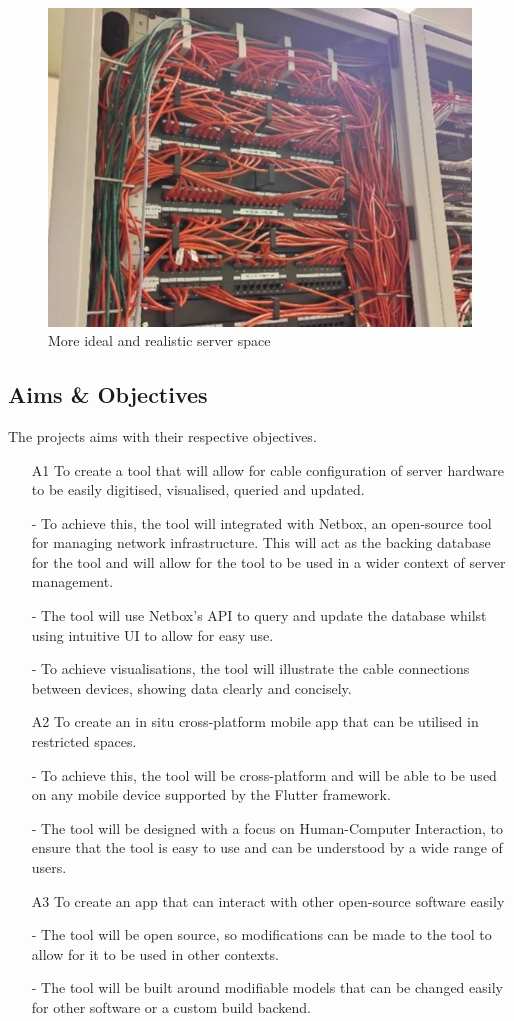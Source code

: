 \documentclass [11pt,a4paper]{article}
\begin{document}
\begin{figure}[H]
    \centering
    \includegraphics[width=0.43\linewidth]{images/server_racks_clean.jpg}
    \caption{More ideal and realistic server space}
    \label{fig:ideal_server_space}
\end{figure}


\subsection{Aims \& Objectives}
\label{sec:objectives}
The projects aims with their respective objectives.
\begin{enumerate} 
    
    \item[A1] To create a tool that will allow for cable configuration of server hardware to be
    easily digitised, visualised, queried and updated. 
        
    - To achieve this, the tool will integrated with Netbox, an open-source tool for managing network infrastructure. This will act as the backing database for the tool and will allow for the tool to be used in a wider context of server management.

        - The tool will use Netbox's API to query and update the database whilst using intuitive UI to allow for easy use.
        
        - To achieve visualisations, the tool will illustrate the cable connections between devices, showing data clearly and concisely.

    \item[A2] To create an in situ cross-platform mobile app that can be utilised in restricted
    spaces.    

    - To achieve this, the tool will be cross-platform and will be able to be used on any mobile device supported by the Flutter framework.
    
    - The tool will be designed with a focus on Human-Computer Interaction, to ensure that the tool is easy to use and can be understood by a wide range of users.

    \item[A3] To create an app that can interact with other open-source software easily
    
        - The tool will be open source, so modifications can be made to the tool to allow for it to be used in other contexts.
        
        - The tool will be built around modifiable models that can be changed easily for other software or a custom build backend.

\end{enumerate}
\end{document}
